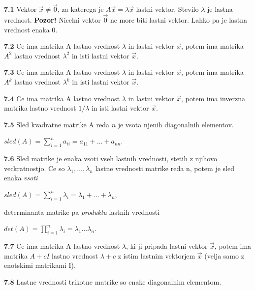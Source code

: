 \documentclass{article}
\begin{document}
\begin{multicols}{4}
	\textbf{7.1} Vektor $\vec{x} \neq \vec{0}$, za katerega je $A\vec{x} = \lambda \vec{x}$ lastni vektor. Stevilo
	$\lambda$ je lastna vrednost.
	\textbf{Pozor!} Nicelni vektor $\vec{0}$ ne more biti lastni vektor. Lahko pa je lastna vrednost enaka 0.

	\textbf{7.2} Ce ima matrika A lastno vrednost $\lambda$ in lastni vektor $\vec{x}$, potem ima matrika
	$A^{2}$ lastno vrednost $\lambda^{2}$ in isti lastni vektor $\vec{x}$.

	\textbf{7.3} Ce ima matrika A lastno vrednost $\lambda$ in lastni vektor $\vec{x}$, potem ima
	matrika $A^{k}$ lastno vrednost $\lambda^{k}$ in isti lastni vektor $\vec{x}$.

	\textbf{7.4} Ce ima matrika A lastno vrednost $\lambda$ in lastni vektor $\vec{x}$, potem ima
	inverzna matrika lastno vrednost $1 / \lambda$ in isti lastni vektor $\vec{x}$.

	\textbf{7.5} Sled kvadratne matrike A reda $n$ je vsota njenih diagonalnih elementov.
	\begin{center}
		\begin{math}
			sled(A) =
			\sum_{i=1}^{n} a_{ii} =
			a_{11} + \dots + a_{nn}
		\end{math}.
	\end{center}

	\textbf{7.6} Sled matrike je enaka vsoti vseh lastnih vrednosti, stetih z njihovo veckratnostjo.
	Ce so $\lambda_{1}, \dots, \lambda_{n}$ lastne vrednosti matrike reda n, potem je sled enaka \textit{vsoti}
	\begin{center}
		\begin{math}
			sled(A) =
			\sum_{i=1}^{n} \lambda_{i} =
			\lambda_{1} + \dots + \lambda_{n}
		\end{math},
	\end{center}
	determinanta matrike pa \textit{produktu} lastnih vrednosti
	\begin{center}
		\begin{math}
			det(A) =
			\prod_{i=1}^{n} \lambda_{i} =
			\lambda_{1} \dots  \lambda_{n}
		\end{math}.
	\end{center}

	\textbf{7.7} Ce ima matrika A lastno vrednost $\lambda$, ki ji pripada lastni vektor $\vec{x}$,
	potem ima matrika $A + cI$ lastno vrednost $\lambda + c$ z istim lastnim vektorjem $\vec{x}$ (velja samo z
	enotskimi matrikami I).

	\textbf{7.8} Lastne vrednosti trikotne matrike so enake diagonalnim elementom.


\end{multicols}
\end{document}
